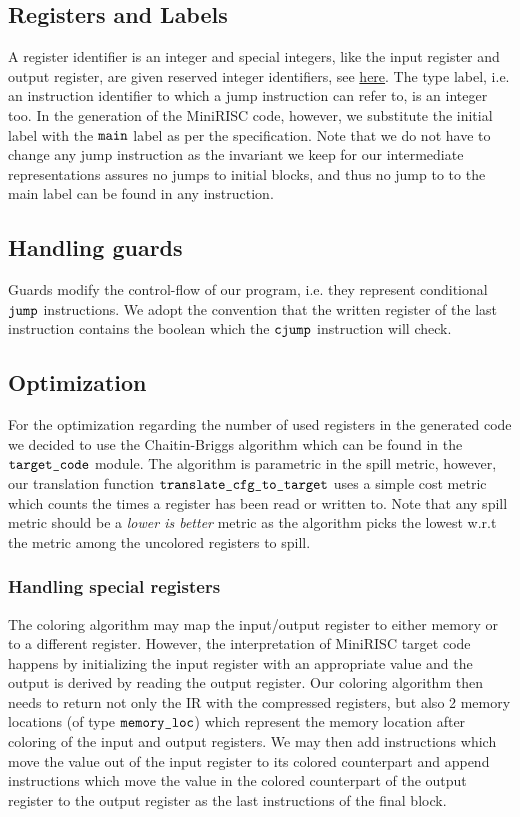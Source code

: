 \documentclass[a4paper,11pt]{report}
\begin{document}
\subsection{Registers and Labels}
A register identifier is an integer and special integers, like the input register and output register, are given reserved integer identifiers, see \href{https://github.com/wuacs/unipi-lci/blob/a630eb254e4eadffe7290cbda91d80f921402fde/project/src/lib/minirisc.mli#L28}{here}.
The type label, i.e. an instruction identifier to which a jump instruction can refer to, is an integer too. In the generation of the MiniRISC code, however, we substitute the initial label with the $\verb|main|$ label as per the specification. Note that we do not have to change any jump instruction as the invariant we keep for our intermediate representations assures no jumps to initial blocks, and thus no jump to to the main label can be found in any instruction.
\subsection{Handling guards}

Guards modify the control-flow of our program, i.e. they represent conditional $\verb|jump|$ instructions. We adopt the convention that the written register of the last instruction contains the boolean which the $\verb|cjump|$ instruction will check. 

\subsection{Optimization}

For the optimization regarding the number of used registers in the generated code we decided to use the Chaitin-Briggs algorithm which can be found in the $\verb|target_code|$ module. The algorithm is parametric in the spill metric, however, our translation function $\verb|translate_cfg_to_target|$ uses a simple cost metric which counts the times a register has been read or written to.
Note that any spill metric should be a \textit{lower is better} metric as the algorithm picks the lowest w.r.t the metric among the uncolored registers to spill.

\subsubsection{Handling special registers}

The coloring algorithm may map the input/output register to either memory or to a different register. However, the interpretation of MiniRISC target code happens by initializing the input register with an appropriate value and the output is derived by reading the output register. Our coloring algorithm then needs to return not only the IR with the compressed registers, but also 2 memory locations (of type $\verb|memory_loc|$) which represent the memory location after coloring of the input and output registers. We may then add instructions which move the value out of the input register to its colored counterpart and append instructions which move the value in the colored counterpart of the output register to the output register as the last instructions of the final block.
\end{document}
